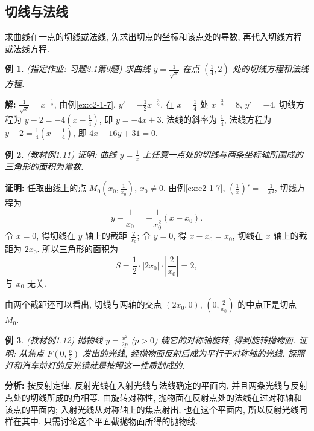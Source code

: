 \documentclass[UTF8,openany]{ctexbook}
\theoremstyle{chinesetextbook}
\newtheorem{example}{例}[section]
\newenvironment{cnproof}{\par\indent\textbf{证明:} \ignorespaces}{\par}
\newenvironment{cnsolution}{\par\indent\textbf{解:} \ignorespaces}{\par}
\begin{document}
\subsection{切线与法线}
求曲线在一点的切线或法线, 先求出切点的坐标和该点处的导数, 再代入切线方程或法线方程.
\begin{example}\label{ex:c2-h1-9}
\textnormal{(指定作业: 习题2.1第9题)} 求曲线 $\displaystyle y=\frac1{\sqrt x}$ 在点 $\displaystyle\left(\frac14,2\right)$ 处的切线方程和法线方程.
\end{example}
\begin{cnsolution}
$\displaystyle\frac1{\sqrt x}=x^{-\frac12}$, 由例\ref{ex:c2-1-7}, $\displaystyle y'=-\frac12x^{-\frac32}$, 在 $\displaystyle x=\frac14$ 处 $x^{-\frac32}=8$, $y'=-4$. 切线方程为 $\displaystyle y-2=-4\left(x-\frac14\right)$, 即 $y=-4x+3$. 法线的斜率为 $\displaystyle\frac14$, 法线方程为 $\displaystyle y-2=\frac14\left(x-\frac14\right)$, 即 $4x-16y+31=0$.
\end{cnsolution}
\begin{example}\label{ex:c2-1-11}
\textnormal{(教材例1.11)} 证明: 曲线 $\displaystyle y=\frac1x$ 上任意一点处的切线与两条坐标轴所围成的三角形的面积为常数.
\end{example}
\begin{cnproof}
任取曲线上的点 $\displaystyle M_0\left(x_0,\frac1{x_0}\right)$, $x_0\ne0$. 由例\ref{ex:c2-1-7}, $\displaystyle\left(\frac1x\right)'=-\frac1{x^2}$, 切线方程为
\[
y-\frac1{x_0}=-\frac1{x_0^2}(x-x_0).
\]
令 $x=0$, 得切线在 $y$ 轴上的截距 $\displaystyle\frac2{x_0}$; 令 $y=0$, 得 $x-x_0=x_0$, 切线在 $x$ 轴上的截距为 $2x_0$. 所以三角形的面积为
\[
S=\frac12\cdot|2x_0|\cdot\left|\frac2{x_0}\right|=2,
\]
与 $x_0$ 无关.
\end{cnproof}
由两个截距还可以看出, 切线与两轴的交点 $(2x_0,0)$, $\displaystyle\left(0,\frac2{x_0}\right)$ 的中点正是切点 $M_0$.
\begin{example}\label{ex:c2-1-12}
\textnormal{(教材例1.12)} 抛物线 $\displaystyle y=\frac{x^2}{2p}$ ($p>0$) 绕它的对称轴旋转, 得到旋转抛物面. 证明: 从焦点 $\displaystyle F\left(0,\frac p2\right)$ 发出的光线, 经抛物面反射后成为平行于对称轴的光线. 探照灯和汽车前灯的反光镜就是按照这一性质制成的.
\end{example}
\par\indent\textbf{分析:} 按反射定律, 反射光线在入射光线与法线确定的平面内, 并且两条光线与反射点处的切线所成的角相等. 由旋转对称性, 抛物面在反射点处的法线在过对称轴和该点的平面内; 入射光线从对称轴上的焦点射出, 也在这个平面内, 所以反射光线同样在其中, 只需讨论这个平面截抛物面所得的抛物线.
\end{document}
